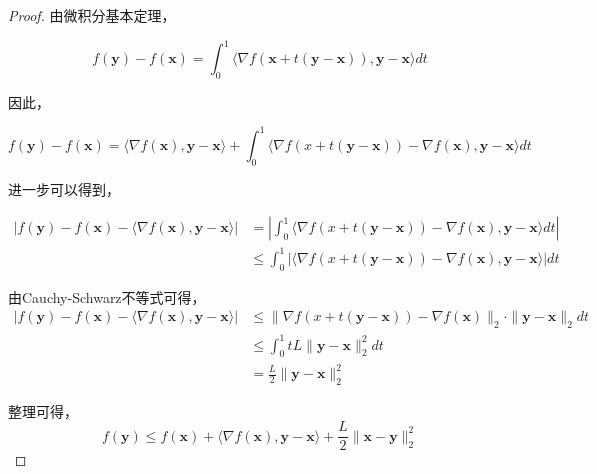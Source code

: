\begin{proof}
    由微积分基本定理，
    
    \begin{equation*}
        f(\bm{y}) - f(\bm{x}) = \int_{0}^{1}\langle \nabla f(\bm{x} + t(\bm{y} - \bm{x})), \bm{y}-\bm{x}\rangle dt
    \end{equation*}

    因此，

    \begin{equation*}
        f(\bm{y}) - f(\bm{x}) = \langle \nabla f(\bm{x}), \bm{y}-\bm{x}\rangle + \int_{0}^{1}\langle \nabla f(x+t(\bm{y}-\bm{x})) - \nabla f(\bm{x}), \bm{y}-\bm{x}\rangle dt
    \end{equation*}

    进一步可以得到，

    \begin{equation*}
        \begin{split}
            |f(\bm{y}) - f(\bm{x}) - \langle \nabla f(\bm{x}), \bm{y}-\bm{x}\rangle| &= |\int_{0}^{1}\langle \nabla f(x+t(\bm{y}-\bm{x})) - \nabla f(\bm{x}), \bm{y}-\bm{x}\rangle dt| \\
            &\leq \int_{0}^{1} |\langle \nabla f(x+t(\bm{y}-\bm{x})) - \nabla f(\bm{x}), \bm{y}-\bm{x}\rangle| dt
        \end{split}
    \end{equation*}

    由Cauchy-Schwarz不等式可得，
    \begin{equation*}
        \begin{split}
            |f(\bm{y}) - f(\bm{x}) - \langle \nabla f(\bm{x}), \bm{y}-\bm{x}\rangle| &\leq \|\nabla f(x+t(\bm{y}-\bm{x})) - \nabla f(\bm{x})\|_{2} \cdot \|\bm{y}-\bm{x}\|_{2} dt \\
            &\leq \int_{0}^{1} tL\|\bm{y}-\bm{x}\|_{2}^{2}dt \\
            &= \frac{L}{2} \|\bm{y}-\bm{x}\|_{2}^{2}
        \end{split}
    \end{equation*}

    整理可得，
    \begin{equation*}
        f(\bm{y}) \leq f(\bm{x}) + \langle \nabla f(\bm{x}), \bm{y}-\bm{x} \rangle + \frac{L}{2}\|\bm{x}-\bm{y}\|_{2}^{2}
    \end{equation*}
\end{proof}



